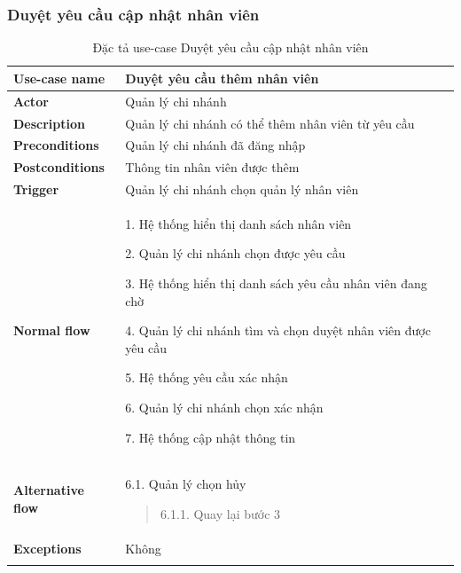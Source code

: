 \subsubsection{Duyệt yêu cầu cập nhật nhân viên}
{
    \setlength\extrarowheight{6pt}
    \begin{longtable}{| p{} | p{} |}
        \hline
        \textbf{Use-case name}
         &
        Duyệt yêu cầu thêm nhân viên
        \\
        \hline
        \textbf{Actor}
         &
        Quản lý chi nhánh
        \\
        \hline
        \textbf{Description}
         &
        Quản lý chi nhánh có thể thêm nhân viên từ yêu cầu
        \\
        \hline
        \textbf{Preconditions}
         &
        Quản lý chi nhánh đã đăng nhập
        \\
        \hline
        \textbf{Postconditions}
         &
        Thông tin nhân viên được thêm
        \\
        \hline
        \textbf{Trigger}
         &
        Quản lý chi nhánh chọn quản lý nhân viên
        \\
        \hline
        \begin{flushleft}
            \textbf{Normal flow}
        \end{flushleft}
         &
        1. Hệ thống hiển thị danh sách nhân viên

        2. Quản lý chi nhánh chọn được yêu cầu

        3. Hệ thống hiển thị danh sách yêu cầu nhân viên đang chờ

        4. Quản lý chi nhánh tìm và chọn duyệt nhân viên được yêu cầu

        5. Hệ thống yêu cầu xác nhận

        6. Quản lý chi nhánh chọn xác nhận

        7. Hệ thống cập nhật thông tin
        \\
        \hline
        \textbf{Alternative flow}
         &
        6.1. Quản lý chọn hủy
        \begin{quote}
            6.1.1. Quay lại bước 3
        \end{quote}
        \\
        \hline
        \textbf{Exceptions}
         &
        Không
        \\
        \hline
        \caption{Đặc tả use-case Duyệt yêu cầu cập nhật nhân viên}
    \end{longtable}
}



